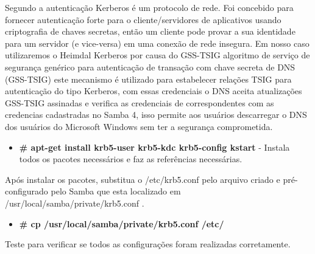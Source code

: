 Segundo \cite{HEIMDAL} a autenticação Kerberos é um protocolo de rede. Foi concebido para fornecer autenticação forte para o cliente/servidores de aplicativos usando criptografia de chaves secretas, então um cliente pode provar a sua identidade para um servidor (e vice-versa) em uma conexão de rede insegura.
Em nosso caso utilizaremos o Heimdal Kerberos por causa do GSS-TSIG algoritmo de serviço de segurança genérico para autenticação de transação com chave secreta de DNS (GSS-TSIG) este mecanismo é utilizado para estabelecer relações TSIG para autenticação do tipo Kerberos, com essas credenciais o DNS aceita atualizações GSS-TSIG assinadas e verifica as credenciais de correspondentes com as credencias cadastradas no Samba 4, isso permite aos usuários descarregar o DNS dos usuários do Microsoft Windows sem ter a segurança comprometida.

\begin{itemize}
	\item \textbf{\# apt-get install krb5-user krb5-kdc krb5-config kstart} - Instala todos os pacotes necessários e faz as referências necessárias.
\end{itemize}

Após instalar os pacotes, substitua o /etc/krb5.conf pelo arquivo criado e pré-configurado pelo Samba que esta localizado em /usr/local/samba/private/krb5.conf .

\begin{itemize}
	\item \textbf{\# cp /usr/local/samba/private/krb5.conf  /etc/}
\end{itemize}

Teste para verificar se todos as configurações foram realizadas corretamente.

